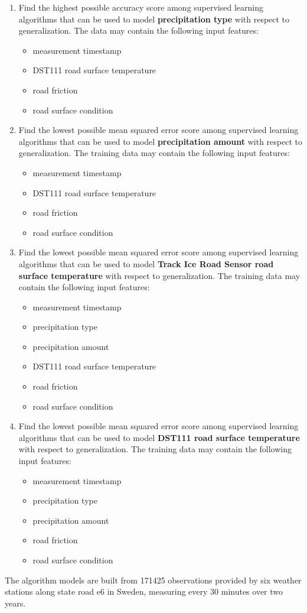 	\begin{enumerate}
		\item Find the highest possible accuracy score among supervised learning algorithms that can be used to model \textbf{precipitation type} with respect to generalization. The data may contain the following input features: 
			\begin{itemize}
				\item measurement timestamp
				\item DST111 road surface temperature
				\item road friction
				\item road surface condition
			\end{itemize}
		\item Find the lowest possible mean squared error score among supervised learning algorithms that can be used to model \textbf{precipitation amount} with respect to generalization. The training data may contain the following input features: 
			\begin{itemize}
				\item measurement timestamp
				\item DST111 road surface temperature
				\item road friction
				\item road surface condition
			\end{itemize}
		\item Find the lowest possible mean squared error score among supervised learning algorithms that can be used to model \textbf{Track Ice Road Sensor road surface temperature} with respect to generalization. The training data may contain the following input features: 
			\begin{itemize}
				\item measurement timestamp
				\item precipitation type
				\item precipitation amount
				\item DST111 road surface temperature
				\item road friction
				\item road surface condition
			\end{itemize}
		\item Find the lowest possible mean squared error score among supervised learning algorithms that can be used to model \textbf{DST111 road surface temperature} with respect to generalization. The training data may contain the following input features:
			\begin{itemize}
				\item measurement timestamp
				\item precipitation type
				\item precipitation amount
				\item road friction
				\item road surface condition
			\end{itemize}
	\end{enumerate}
The algorithm models are built from 171425 observations provided by six weather stations along state road e6 in Sweden, measuring every 30 minutes over two years.

